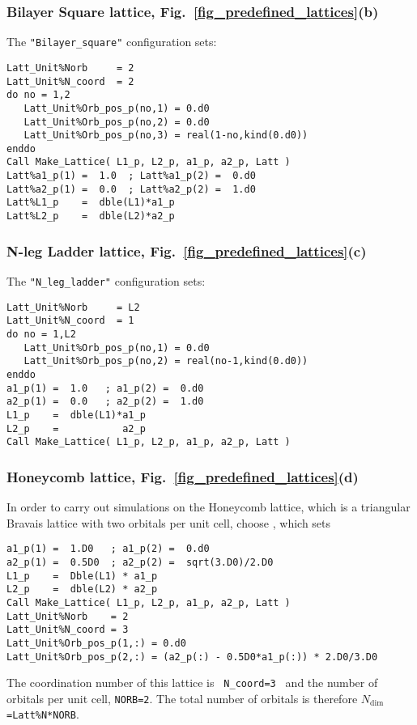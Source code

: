 \subsubsection{Bilayer Square lattice, Fig.~\ref{fig_predefined_lattices}(b)}
The \texttt{"Bilayer\_square"}   configuration sets:
\begin{lstlisting}[style=fortran]
Latt_Unit%Norb     = 2
Latt_Unit%N_coord  = 2
do no = 1,2
   Latt_Unit%Orb_pos_p(no,1) = 0.d0 
   Latt_Unit%Orb_pos_p(no,2) = 0.d0 
   Latt_Unit%Orb_pos_p(no,3) = real(1-no,kind(0.d0))
enddo
Call Make_Lattice( L1_p, L2_p, a1_p, a2_p, Latt )
Latt%a1_p(1) =  1.0  ; Latt%a1_p(2) =  0.d0
Latt%a2_p(1) =  0.0  ; Latt%a2_p(2) =  1.d0
Latt%L1_p    =  dble(L1)*a1_p
Latt%L2_p    =  dble(L2)*a2_p
\end{lstlisting}


\subsubsection{N-leg Ladder lattice,  Fig.~\ref{fig_predefined_lattices}(c)}
The \texttt{"N\_leg\_ladder"}   configuration sets:
\begin{lstlisting}[style=fortran]
Latt_Unit%Norb     = L2
Latt_Unit%N_coord  = 1
do no = 1,L2
   Latt_Unit%Orb_pos_p(no,1) = 0.d0 
   Latt_Unit%Orb_pos_p(no,2) = real(no-1,kind(0.d0))
enddo
a1_p(1) =  1.0   ; a1_p(2) =  0.d0
a2_p(1) =  0.0   ; a2_p(2) =  1.d0
L1_p    =  dble(L1)*a1_p
L2_p    =           a2_p
Call Make_Lattice( L1_p, L2_p, a1_p, a2_p, Latt )
\end{lstlisting}


\subsubsection{Honeycomb lattice, Fig.~\ref{fig_predefined_lattices}(d)}

In order to carry out simulations on the Honeycomb lattice, which is a triangular Bravais lattice with two orbitals per unit cell, choose , which sets
\begin{lstlisting}[style=fortran]
a1_p(1) =  1.D0   ; a1_p(2) =  0.d0
a2_p(1) =  0.5D0  ; a2_p(2) =  sqrt(3.D0)/2.D0
L1_p    =  Dble(L1) * a1_p
L2_p    =  dble(L2) * a2_p
Call Make_Lattice( L1_p, L2_p, a1_p, a2_p, Latt )
Latt_Unit%Norb    = 2
Latt_Unit%N_coord = 3
Latt_Unit%Orb_pos_p(1,:) = 0.d0 
Latt_Unit%Orb_pos_p(2,:) = (a2_p(:) - 0.5D0*a1_p(:)) * 2.D0/3.D0
\end{lstlisting}
The coordination number of this lattice is \texttt{ N\_coord=3 }  and  the number of orbitals per unit cell, \texttt{NORB=2}. The total number of orbitals is therefore \texttt{$N_{\mathrm{dim}}$=Latt\%N*NORB}.


